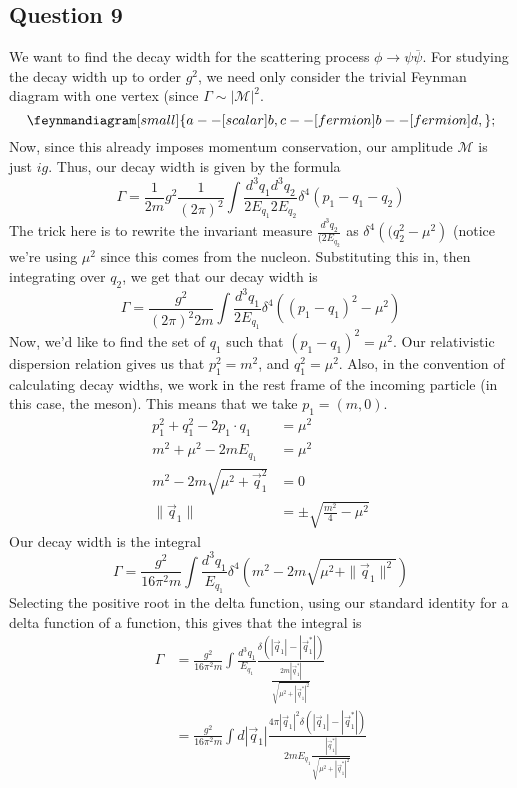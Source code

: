 \subsection{Question 9} 
We want to find the decay width 
for the scattering process $ \phi \to \psi \overline{ \psi } $. 
For studying the decay width up to order $ g ^ 2 $, 
we need only consider the trivial Feynman diagram with 
one vertex (since $ \Gamma \sim | \mathcal{ M } | ^ 2 $.  
\begin{equation*}
	\feynmandiagram[small]{
		a -- [scalar] b, 
		c -- [fermion] b -- [fermion] d, 
	}; 
\end{equation*}
Now, since this already imposes momentum conservation, 
our amplitude $\mathcal{ M } $ is just $  i g  $.
Thus, our decay width is given by the formula 
\[
	\Gamma = \frac{1}{2m } g ^ 2 \frac{1}{( 2 \pi ) ^ 2}  \int 
	\frac{d ^ 3 q_1  d ^ 3 q_2 }{ 2 E _{ q_1 } 2 E _{ q_2 } } \delta ^ 4 ( p_1- q_1 - q_2) 
\] The trick here is to 
rewrite the invariant measure $ \frac{ d ^ 3 q_2 }{ ( 2 E_{ q_2 } }$ as $  \delta^ 4 \left(  
( q_2 ^ 2 - \mu ^ 2 \right)  $ (notice we're using $ \mu ^ 2 $ since this 
comes from the nucleon. 
Substituting this in, then integrating over $ q_2 $, 
we get that our decay width is 
\[
	\Gamma = \frac{g ^ 2 }{ ( 2 \pi ) ^ 2 2m } \int \frac{d ^ 3 q_1 }{ 2 E_{ q_1 } } \delta ^  4
	\left(  ( p_1 - q_1 ) ^ 2  - \mu ^ 2  \right) 
\] Now, we'd like to find the set of $ q_1 $ such that $ ( p_1 - q_1 ) ^ 2  = \mu ^ 2 $. 
Our relativistic dispersion relation gives us that $ p_1 ^ 2 = m ^ 2 $, 
and $q_1 ^ 2 = \mu ^ 2 $. Also, in the convention of calculating 
decay widths, we work in the rest frame of the incoming particle (in this case, 
the meson). This means that we take $ p_1 = ( m , 0 ) $. 
\begin{align*}
	p_1 ^ 2 + q_1 ^ 2 - 2 p_1 \cdot  q_1  &=  \mu ^ 2 \\
	m ^ 2 + \mu ^ 2  - 2 m E_{ q_1 }  &= \mu ^ 2 \\
	m ^ 2  - 2m \sqrt{ \mu ^ 2 + \vec{q} _ 1 ^ 2 } &=  0  \\
	\| \vec{q} _ 1 \|  & = \pm \sqrt{ \frac{m ^ 2 }{ 4 }  - \mu ^ 2 } 
\end{align*}
Our decay width is the integral 
\[
	\Gamma = \frac{g ^ 2 }{ 16 \pi ^ 2 m } \int \frac{d ^ 3 q_1 }{ E_{ q_1 } } \delta ^ 4 \left(  
	m ^ 2- 2m \sqrt{ \mu ^ 2 + \| \vec{q} _ 1 \| ^ 2 } \right) 
\] Selecting the positive root in the delta function, using 
our standard identity for a delta function of a function, this 
gives that the integral is 
\begin{align*} 
	\Gamma & = \frac{g ^ 2 }{ 16 \pi ^ 2 m } \int \frac{d ^ 3 q_1 }{ E_{ q_1 } } 
	\frac{\delta \left(  | \vec{q} _ 1 |   - | \vec{q} _ 1 ^ * |   \right) }{
	 \frac{2m | \vec{q} _ 1 ^ * | }{ \sqrt{ \mu ^ 2 + |\vec{q} _ 1 ^ *  | ^ 2 }  }} \\
	 &=  \frac{ g ^ 2 }{ 16 \pi ^ 2 m } \int d |\vec{q} _ 1 | \frac{ 4 \pi | \vec{q} _ 1 | ^ 2 
	 \delta ( | \vec{q} _ 1 |  - | \vec{q} _ 1 ^ * | ) }{2m E_{ q _ 1  } \frac{| \vec{q} _ 1 ^ * | }{
 \sqrt{ \mu ^ 2 + | \vec{q} _ 1 ^ * | ^ 2 } }} \\
 \end{align*} 
